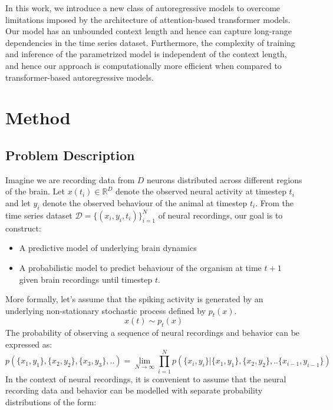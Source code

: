 \documentclass[12pt]{article}
\begin{document}
In this work, we introduce a new class of autoregressive models to overcome limitations imposed by the architecture of attention-based transformer models. Our model has an unbounded context length and hence can capture long-range dependencies in the time series dataset. Furthermore, the complexity of training and inference of the parametrized model is independent of the context length, and hence our approach is computationally more efficient when compared to transformer-based autoregressive models.







\section{Method}
\subsection{Problem Description}
Imagine we are recording data from $D$ neurons distributed across different regions of the brain. Let $x(t_i) \in \mathbb{R}^D$ denote the observed neural activity at timestep $t_i$ and let $y_i$ denote the observed behaviour of the animal at timestep $t_i$. From the time series dataset $\mathcal{D} = \{(x_i,y_i,t_i) \}_{i=1}^N$ of neural recordings, our goal is to
construct:
\begin{itemize}
    \item A predictive model of underlying brain dynamics
    \item A probabilistic model to predict behaviour of the organism at time $t+1$ given brain recordings until timestep $t$.
\end{itemize}
More formally, let's assume that the spiking activity is generated by an underlying non-stationary stochastic process defined by $p_t(x)$. 
\begin{equation}
    x(t) \sim p_t(x)
\end{equation}
The probability of observing a sequence of neural recordings and behavior can be expressed as:
\begin{equation}
    p( \{x_1,y_1\},\{x_2,y_2\},\{x_3,y_3\},..) = 
    \lim_{N \to \infty} \prod_{i=1}^{N} p(\{x_{i},y_{i}\}| \{x_1,y_1\},\{x_2,y_2\},..\{x_{i-1},y_{i-1}\})
\end{equation}
In the context of neural recordings, it is convenient to assume that the neural recording data and behavior can be modelled with separate probability distributions of the form:
\end{document}
